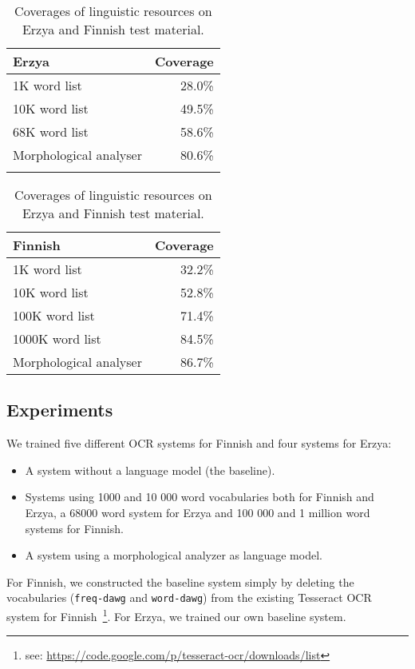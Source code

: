 \documentclass[b5paper]{article}
\begin{document}
\begin{table}[!htb]
\begin{center}
\begin{tabular}{lr}
\hline 
Erzya                   & Coverage  \\
\hline 
1K word list            &   28.0\%  \\
10K word list           &   49.5\%  \\
68K word list           &   58.6\%  \\
Morphological analyser  &   80.6\%  \\
                        &
\end{tabular}
\quad
\begin{tabular}{lr}
\hline 
Finnish                 & Coverage \\
\hline 
1K word list            &  32.2\% \\
10K word list           &  52.8\% \\
100K word list          &  71.4\% \\
1000K word list         &  84.5\% \\
Morphological analyser  &  86.7\% 
\end{tabular}
\caption{Coverages of linguistic resources on Erzya and Finnish test material.}\label{fin-myv-coverage}
\end{center}
\end{table}

\subsection{Experiments}
We trained five different OCR systems for Finnish and four systems for Erzya:
\begin{itemize}
\item A system without a language model (the baseline).
\item Systems using 1000 and 10 000 word vocabularies both for Finnish
  and Erzya, a 68000 word system for Erzya and 100 000 and 1 million
  word systems for Finnish.
\item A system using a morphological analyzer as language model.
\end{itemize}

For Finnish, we constructed the baseline system simply by deleting the
vocabularies ({\tt freq-dawg} and {\tt word-dawg}) from the existing
Tesseract OCR system for Finnish~\footnote{see:
  \url{https://code.google.com/p/tesseract-ocr/downloads/list}}. For
Erzya, we trained our own baseline system.
\end{document}
